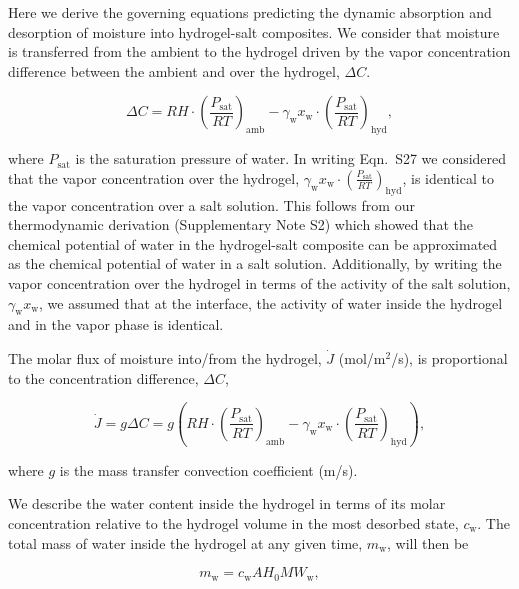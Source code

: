 \documentclass[11pt]{article}
\begin{document}
Here we derive the governing equations predicting the dynamic absorption and desorption of moisture into hydrogel-salt composites. We consider that moisture is transferred from the ambient to the hydrogel driven by the vapor concentration difference between the ambient and over the hydrogel, $\Delta C$.

\begin{equation}
\Delta C = RH \cdot \left(\frac{P_\mathrm{sat}}{RT}\right)_\mathrm{amb} - \gamma_\mathrm{w} x_\mathrm{w} \cdot \left(\frac{P_\mathrm{sat}}{RT}\right)_\mathrm{hyd}, \tag{S27}
\end{equation}

where $P_\mathrm{sat}$ is the saturation pressure of water. In writing Eqn.~S27 we considered that the vapor concentration over the hydrogel, $\gamma_\mathrm{w} x_\mathrm{w} \cdot \left(\frac{P_\mathrm{sat}}{RT}\right)_\mathrm{hyd}$, is identical to the vapor concentration over a salt solution.\cite{diazmarin2024} This follows from our thermodynamic derivation (Supplementary Note S2) which showed that the chemical potential of water in the hydrogel-salt composite can be approximated as the chemical potential of water in a salt solution. Additionally, by writing the vapor concentration over the hydrogel in terms of the activity of the salt solution, $\gamma_\mathrm{w} x_\mathrm{w}$, we assumed that at the interface, the activity of water inside the hydrogel and in the vapor phase is identical.

The molar flux of moisture into/from the hydrogel, $\dot{J}$ (mol/m$^2$/s), is proportional to the concentration difference, $\Delta C$,\cite{mills1994}

\begin{equation}
\dot{J} = g\Delta C = g\left(RH \cdot \left(\frac{P_\mathrm{sat}}{RT}\right)_\mathrm{amb} - \gamma_\mathrm{w} x_\mathrm{w} \cdot \left(\frac{P_\mathrm{sat}}{RT}\right)_\mathrm{hyd}\right), \tag{S28}
\end{equation}

where $g$ is the mass transfer convection coefficient (m/s).

We describe the water content inside the hydrogel in terms of its molar concentration relative to the hydrogel volume in the most desorbed state, $c_\mathrm{w}$. The total mass of water inside the hydrogel at any given time, $m_\mathrm{w}$, will then be

\begin{equation}
m_\mathrm{w} = c_\mathrm{w} A H_0 MW_\mathrm{w}, \tag{S29}
\end{equation}
\end{document}
